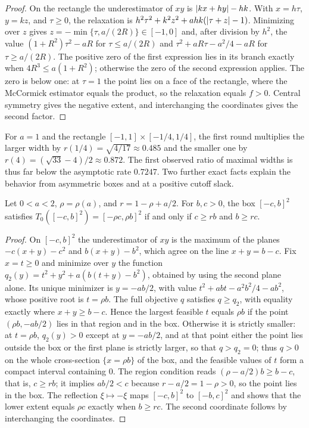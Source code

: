 \begin{proof}
On the rectangle the underestimator of $xy$ is $\lvert kx+hy\rvert-hk$. With
$x=h\tau$, $y=kz$, and $\tau\ge0$, the relaxation is
$h^2\tau^2+k^2z^2+ahk(\lvert \tau+z\rvert-1)$. Minimizing over $z$ gives
$z=-\min\{\tau,a/(2R)\}\in[-1,0]$ and, after division by $h^2$, the value
$(1+R^2)\tau^2-aR$ for $\tau\le a/(2R)$ and $\tau^2+aR\tau-a^2/4-aR$ for
$\tau\ge a/(2R)$. The positive zero of the first expression lies in its
branch exactly when $4R^3\le a(1+R^2)$; otherwise the zero of the second
expression applies. The zero is below one: at $\tau=1$ the point lies on a
face of the rectangle, where the McCormick estimator equals the product, so
the relaxation equals $f>0$. Central symmetry gives the negative extent, and
interchanging the coordinates gives the second factor.
\end{proof}

For $a=1$ and the rectangle $[-1,1]\times[-1/4,1/4]$, the first round
multiplies the larger width by $r(1/4)=\sqrt{4/17}\approx0.485$ and the
smaller one by $r(4)=(\sqrt{33}-4)/2\approx0.872$. The first observed ratio
of maximal widths is thus far below the asymptotic rate $0.7247$. Two
further exact facts explain the behavior from asymmetric boxes and at a
positive cutoff slack.

\begin{proposition}\label{prop:asymmetric-eigenboxes}
Let $0<a<2$, $\rho=\rho(a)$, and $r=1-\rho+a/2$. For $b,c>0$, the box
$[-c,b]^2$ satisfies $T_0([-c,b]^2)=[-\rho c,\rho b]^2$ if and only if
$c\ge rb$ and $b\ge rc$.
\end{proposition}

\begin{proof}
On $[-c,b]^2$ the underestimator of $xy$ is the maximum of the planes
$-c(x+y)-c^2$ and $b(x+y)-b^2$, which agree on the line $x+y=b-c$. Fix
$x=t\ge0$ and minimize over $y$ the function
$q_2(y)=t^2+y^2+a(b(t+y)-b^2)$, obtained by using the second plane alone.
Its unique minimizer is $y=-ab/2$, with value $t^2+abt-a^2b^2/4-ab^2$, whose
positive root is $t=\rho b$. The full objective $q$ satisfies $q\ge q_2$, with
equality exactly where $x+y\ge b-c$. Hence the largest feasible $t$ equals
$\rho b$ if the point $(\rho b,-ab/2)$ lies in that region and in the box.
Otherwise it is strictly smaller: at $t=\rho b$, $q_2(y)>0$ except at
$y=-ab/2$, and at that point either the point lies outside the box or the
first plane is strictly larger, so that $q>q_2=0$; thus $q>0$ on the whole
cross-section $\{x=\rho b\}$ of the box, and the feasible values of $t$ form a
compact interval containing $0$.
The region condition reads $(\rho-a/2)b\ge b-c$, that is, $c\ge rb$; it
implies $ab/2<c$ because $r-a/2=1-\rho>0$, so the point lies in the box. The
reflection $\xi\mapsto-\xi$ maps $[-c,b]^2$ to $[-b,c]^2$ and shows that the
lower extent equals $\rho c$ exactly when $b\ge rc$. The second coordinate
follows by interchanging the coordinates.
\end{proof}

